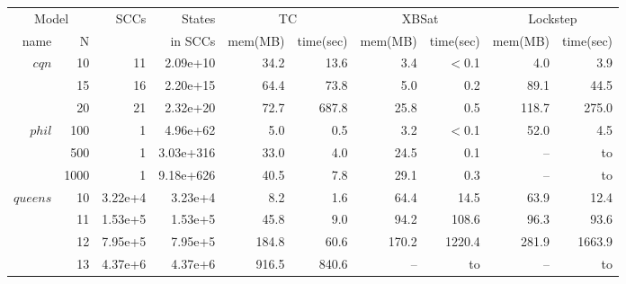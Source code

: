 
\renewcommand{\baselinestretch}{0.85}
\small %
\setlength{\tabcolsep}{0.43ex}
\begin{tabular}{|r|r|r|r|r| r|r|r|r|r|}
\hline
\multicolumn{2}{|c|}{Model} & \multirow{2}{*}{SCCs} & States& \multicolumn{2}{|c|}{TC} & \multicolumn{2}{|c|}{XBSat} & \multicolumn{2}{|c|}{Lockstep} \\
                       \cline{1-2}\cline{5-10}
                                                                    name & N &  & in SCCs  & mem(MB) & time(sec) & mem(MB) & time(sec) & mem(MB) & time(sec)\\
\hline \hline
\multirow{3}{*}{$cqn$}  &10 &11     &2.09e+10   & 34.2      & 13.6  & 3.4   & $<$0.1    & 4.0   &3.9 \\
                        &15 &16     &2.20e+15   & 64.4  & 73.8  & 5.0   & 0.2       & 89.1  &44.5 \\
                        &20 &21     &2.32e+20   & 72.7  &687.8      &25.8   &0.5        &118.7  &275.0  \\
\hline
\multirow{3}{*}{$phil$} &100        &1  &4.96e+62       &5.0    &0.5        &3.2    &$<$0.1     &52.0   &4.5 \\
                        &500        &1  &3.03e+316      &33.0   &4.0        &24.5   &0.1        &--     &to  \\
                        &1000       &1  &9.18e+626      &40.5   &7.8        &29.1   &0.3        &--     &to  \\
\hline
\multirow{4}{*}{$queens$} &10 &3.22e+4    &3.23e+4        &8.2    &1.6        &64.4   &14.5       &63.9   &12.4   \\
                          &11 &1.53e+5    &1.53e+5        &45.8   &9.0        &94.2   &108.6      &96.3   &93.6   \\
                          &12 &7.95e+5    &7.95e+5        &184.8  &60.6       &170.2  &1220.4     &281.9  &1663.9 \\
                          &13 &4.37e+6    &4.37e+6        &916.5  &840.6      &--     &to         &--     &to     \\


\end{tabular}
